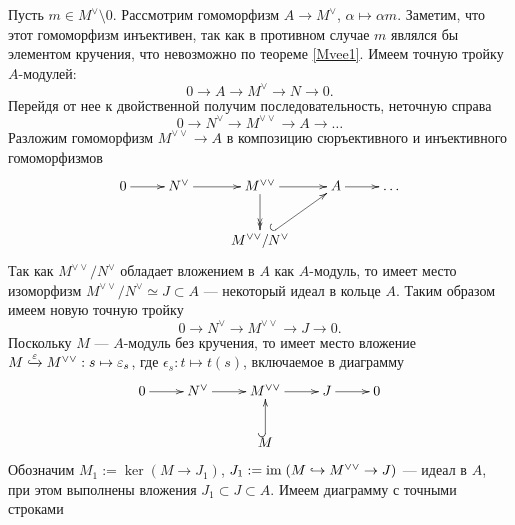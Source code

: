     Пусть $m \in M^{\vee} \setminus 0$. Рассмотрим гомоморфизм $A \rightarrow M^\vee$, $\alpha \mapsto \alpha m$.
    Заметим, что этот гомоморфизм инъективен, так как в противном случае $m$ являлся бы элементом 
    кручения, что невозможно по теореме \ref{Mvee1}. Имеем точную тройку $A$-модулей:
    \begin{equation*}
        0 \rightarrow A \rightarrow M^\vee \rightarrow N \rightarrow 0.
    \end{equation*}
    Перейдя от нее к двойственной получим последовательность, неточную справа
    \begin{equation*}
        0 \rightarrow N^\vee \rightarrow M^{\vee \vee} \rightarrow A \rightarrow \dots
    \end{equation*}
    Разложим гомоморфизм $M^{\vee \vee} \rightarrow A$ в композицию сюръективного и инъективного 
    гомоморфизмов
    \begin{equation*}
        \xymatrix{
            0 \ar[r]
            &N^\vee \ar[r] 
            &M^{\vee \vee} \ar[r] \ar@{>>}[d]
            &A \ar[r]
            &\dots \\
            &
            &
            M^{\vee \vee} / N^\vee \ar@{^{(}->}[ru]
        }
    \end{equation*}
    Так как $ M^{\vee \vee} / N^\vee$ обладает вложением в $A$ как $A$-модуль, то имеет место 
    изоморфизм  $ M^{\vee \vee} / N^\vee \simeq J \subset A$ --- некоторый идеал в кольце $A$. Таким 
    образом имеем новую точную тройку
    \begin{equation*}
        0 \rightarrow N^\vee \rightarrow M^{\vee \vee} \rightarrow J \rightarrow 0.
    \end{equation*}
    Поскольку $M$ --- $A$-модуль без кручения, то имеет место вложение \linebreak
    $ M \lhook\joinrel\xrightarrow{\epsilon} M^{\vee \vee} : s \mapsto \epsilon_s$, где $\epsilon_s : t \mapsto t(s)$, 
    включаемое в диаграмму
    \begin{equation*}
        \xymatrix{
            0 \ar[r]
            &N^\vee \ar[r] 
            &M^{\vee \vee} \ar[r] 
            &J \ar[r]
            &0\\
            &
            &M \ar@{^{(}->}[u]
        }
    \end{equation*}
    Обозначим $M_1 := \ker(M \rightarrow J_1)$, $J_1 := \textup{im\;}(M \hookrightarrow M^{\vee \vee} \rightarrow J)$ --- 
    идеал в $A$, при этом выполнены вложения $J_1 \subset J \subset A$. 
    Имеем диаграмму с точными строками
